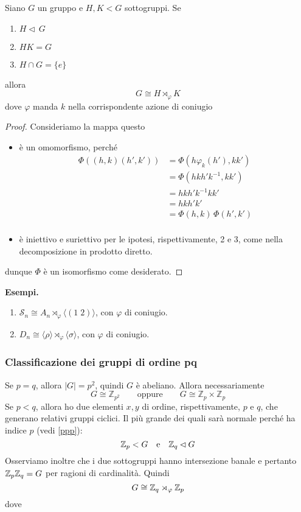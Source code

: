 \begin{multicols}{2}
\begin{theorem}[di decomposizione]
	Siano $ G $ un gruppo e $ H, K < G $ sottogruppi. Se
	\begin{enumerate}
		\item $ H \lhd\, G $
		\item $ HK = G $
		\item $ H \cap G = \{e\} $
	\end{enumerate}
allora $$  G \cong H \rtimes_\varphi K  $$ dove $ \varphi $ manda $ k $ nella corrispondente azione di coniugio 
\end{theorem}
\begin{proof}
	Consideriamo la mappa 
	questo
	\begin{itemize}
		\item è un omomorfismo, perché \begin{align*}
			\Phi((h, k)(h', k')) &= \Phi(h\varphi_k(h'), kk') \\
			&= \Phi(hkh'k^{-1}, kk') \\
			&= hkh'k^{-1}kk' \\
			&= hkh'k'\\
			&= \Phi(h, k)\,\Phi(h', k')\\
		\end{align*}
		\item è iniettivo e suriettivo per le ipotesi, rispettivamente, 2 e 3, come nella decomposizione in prodotto diretto.
	\end{itemize}
dunque $ \Phi $ è un isomorfismo come desiderato.
\end{proof}

\textbf{Esempi.}
\begin{enumerate}
	\item $ \mathcal{S}_n \cong A_n \rtimes_\varphi \langle (1 \; 2) \rangle $, con $ \varphi $ di coniugio.
	\item $ D_n \cong \langle \rho \rangle \rtimes_\varphi \langle \sigma \rangle $, con $ \varphi $ di coniugio.
\end{enumerate}

\columnbreak
\subsubsection{Classificazione dei gruppi di ordine pq}

Se $ p = q $, allora $ |G| = p^2 $, quindi $ G $ è abeliano. Allora necessariamente
\[ G \cong \mathbb{Z}_{p^2}  \qquad \text{oppure} \qquad G \cong \mathbb{Z}_{p}\times\mathbb{Z}_{p} \]
Se $ p < q $, allora ho due elementi $ x, y $ di ordine, rispettivamente, $ p $ e $ q $, che generano relativi gruppi ciclici. Il più grande dei quali sarà normale perché ha indice $ p $ (vedi \ref{ppp}):
$$  \mathbb{Z}_p < G \quad\text{e}\quad \mathbb{Z}_q \lhd G $$
Osserviamo inoltre che i due sottogruppi hanno intersezione banale e pertanto $ \mathbb{Z}_p\mathbb{Z}_q = G $ per ragioni di cardinalità. Quindi
\[ G \cong \mathbb{Z}_q \rtimes_{\varphi} \mathbb{Z}_p \]
dove


\end{multicols}
